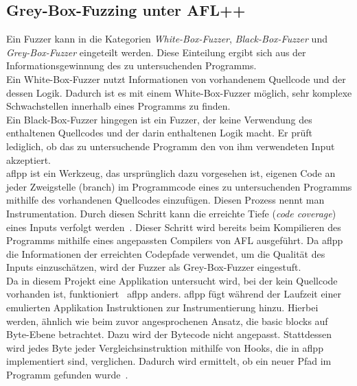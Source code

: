 \subsection{Grey-Box-Fuzzing unter AFL++}\label{subsec:greybox-fuzzing}
Ein Fuzzer kann in die Kategorien \textit{White-Box-Fuzzer}, \textit{Black-Box-Fuzzer} und \textit{Grey-Box-Fuzzer} eingeteilt werden.
Diese Einteilung ergibt sich aus der Informationsgewinnung des zu untersuchenden Programms.\\
\linebreak
Ein White-Box-Fuzzer nutzt Informationen von vorhandenem Quellcode und der dessen Logik.
Dadurch ist es mit einem White-Box-Fuzzer möglich, sehr komplexe Schwachstellen innerhalb eines Programms zu finden. \\
Ein Black-Box-Fuzzer hingegen ist ein Fuzzer, der keine Verwendung des enthaltenen Quellcodes und der darin enthaltenen
Logik macht.
Er prüft lediglich, ob das zu untersuchende Programm den von ihm verwendeten Input akzeptiert\cite{iot-fuzzing}. \\
\gls{aflpp} ist ein Werkzeug, das ursprünglich dazu vorgesehen ist, eigenen Code an jeder Zweigstelle (branch) im
Programmcode eines zu untersuchenden Programms mithilfe des vorhandenen Quellcodes einzufügen.
Diesen Prozess nennt man Instrumentation.
Durch diesen Schritt kann die erreichte Tiefe (\textit{code coverage}) eines Inputs verfolgt werden~\cite{afl-instr}.
Dieser Schritt wird bereits beim Kompilieren des Programms mithilfe eines angepassten Compilers von AFL ausgeführt.
Da \gls{aflpp} die Informationen der erreichten Codepfade verwendet, um die Qualität des Inputs einzuschätzen,
wird der Fuzzer als Grey-Box-Fuzzer eingestuft.\\
Da in diesem Projekt eine Applikation untersucht wird, bei der kein Quellcode vorhanden ist, funktioniert ~\gls{aflpp}
anders.
\gls{aflpp} fügt während der Laufzeit einer emulierten Applikation Instruktionen zur Instrumentierung hinzu.
Hierbei werden, ähnlich wie beim zuvor angesprochenen Ansatz, die basic blocks auf Byte-Ebene betrachtet.
Dazu wird der Bytecode nicht angepasst.
Stattdessen wird jedes Byte jeder Vergleichsinstruktion mithilfe von
Hooks, die in \gls{aflpp} implementiert sind, verglichen.
Dadurch wird ermittelt, ob ein neuer Pfad im Programm gefunden wurde~\cite[vgl.][6]{AFLplusplus-Woot20}.
